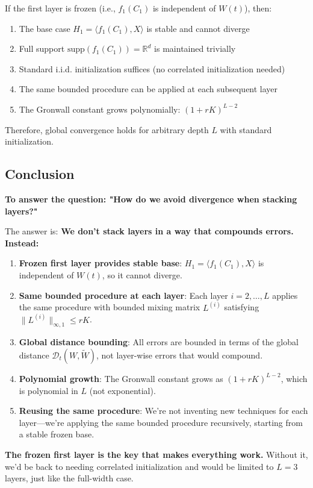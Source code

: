 \begin{theorem}
If the first layer is frozen (i.e., $f_1(C_1)$ is independent of $W(t)$), then:
\begin{enumerate}
\item The base case $H_1 = \langle f_1(C_1), X\rangle$ is stable and cannot diverge
\item Full support $\text{supp}(f_1(C_1)) = \mathbb{R}^d$ is maintained trivially
\item Standard i.i.d. initialization suffices (no correlated initialization needed)
\item The same bounded procedure can be applied at each subsequent layer
\item The Gronwall constant grows polynomially: $(1+rK)^{L-2}$
\end{enumerate}
Therefore, global convergence holds for arbitrary depth $L$ with standard initialization.
\end{theorem}

\subsection{Conclusion}

\textbf{To answer the question: "How do we avoid divergence when stacking layers?"}

The answer is: \textbf{We don't stack layers in a way that compounds errors. Instead:}

\begin{enumerate}
\item \textbf{Frozen first layer provides stable base}: $H_1 = \langle f_1(C_1), X\rangle$ is independent of $W(t)$, so it cannot diverge.

\item \textbf{Same bounded procedure at each layer}: Each layer $i = 2, \ldots, L$ applies the same procedure with bounded mixing matrix $L^{(i)}$ satisfying $\|L^{(i)}\|_{\infty,1} \le rK$.

\item \textbf{Global distance bounding}: All errors are bounded in terms of the global distance $\mathscr{D}_t(W, \tilde{W})$, not layer-wise errors that would compound.

\item \textbf{Polynomial growth}: The Gronwall constant grows as $(1+rK)^{L-2}$, which is polynomial in $L$ (not exponential).

\item \textbf{Reusing the same procedure}: We're not inventing new techniques for each layer—we're applying the same bounded procedure recursively, starting from a stable frozen base.
\end{enumerate}

\textbf{The frozen first layer is the key that makes everything work.} Without it, we'd be back to needing correlated initialization and would be limited to $L=3$ layers, just like the full-width case.
